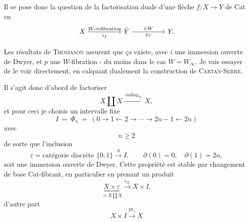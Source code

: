 \documentclass[11pt]{article}
\newcommand{\printedpage}[1]{\marginpar{\footnotesize p.~#1}}
\newcommand{\msp}[1]{\marginpar{\footnotesize [#1]}}
\begin{document}
\printedpage{145}

\msp{page 228}
Il se pose donc la question de la factorisation duale d'une flèche $f : X \longrightarrow Y$ de Cat en
\[
\begin{tikzcd}[column sep=huge]
X \arrow[r, hook, "W\text{-cofibration}", "i_f"'] & \tilde{Y} \arrow[r, "\in W", "p_f"'] & Y.
\end{tikzcd}
\]

Les résultats de \textsc{Thomason} assurent que ça existe, avec $i$ une immersion ouverte de Dwyer, et $p$ une $W$-fibration - du moins dans le cas $W = W_\infty$. Je vais essayer de le voir directement, en calquant dualement la construction de \textsc{Cartan-Serre}.

Il s'agit donc d'abord de factoriser
\[
X \amalg X \xrightarrow{\ \mathrm{codiag}_X\ } X,
\]
et pour ceci je choisis un intervalle fixe
\[
I \ = \ \Phi_n \ = \ (0 \longrightarrow 1 \longleftarrow 2 \longrightarrow \cdots \longrightarrow 2n-1 \longleftarrow 2n)
\]
avec
\[
n \geq 2
\]
de sorte que l'inclusion
\[
\varepsilon = \text{catégorie discrète } \{0,1\} \xrightarrow{\partial} I, \qquad \partial(0) = 0, \quad \partial(1) = 2n,
\]
soit une immersion ouverte de Dwyer. Cette propriété est stable par changement de base Cat-fibrant, en particulier en prenant un produit
\[
\underbrace{X \times \varepsilon}_{\simeq X \coprod X} \xrightarrow{i_X} X \times I,
\]
\begingroup\renewcommand{\thefootnote}{}\endgroup
\printedpage{146}
\msp{page 229}
d'autre part
\[
X \times I \xrightarrow{\mathrm{pr}_1} X
\]
\end{document}

